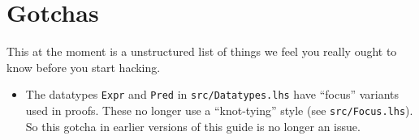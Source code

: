 \section{Gotchas}

This at the moment is a unstructured list of things we feel you really
ought to know before you start hacking.

\begin{itemize}
  \item
    The datatypes \texttt{Expr} and \texttt{Pred}
    in \texttt{src/Datatypes.lhs} have ``focus'' variants
    used in proofs.
    These no longer use a ``knot-tying'' style (see \texttt{src/Focus.lhs}).
    So this gotcha in earlier versions of this guide
    is no longer an issue.
\end{itemize}
